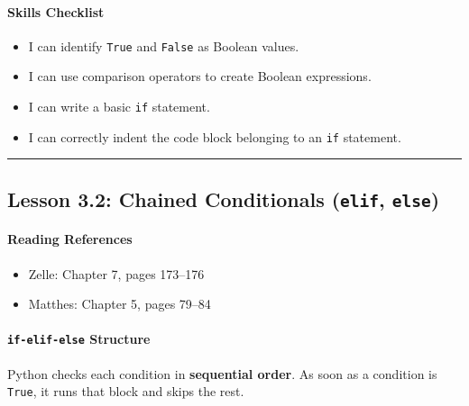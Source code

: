 \documentclass[
  justified,
  openright,
]{tufte-book}
\let\subsubsection\paragraph
\let\paragraph\paragraph
\let\subsubsection\paragraph
\let\paragraph\paragraph
\providecommand{\tightlist}{%
  \setlength{\itemsep}{0pt}\setlength{\parskip}{0pt}}
\begin{document}
\subsubsection{Skills Checklist}\label{skills-checklist-12}

\begin{itemize}
\tightlist
\item[$\square$]
  I can identify \texttt{True} and \texttt{False} as Boolean values.
\item[$\square$]
  I can use comparison operators to create Boolean expressions.
\item[$\square$]
  I can write a basic \texttt{if} statement.
\item[$\square$]
  I can correctly indent the code block belonging to an \texttt{if}
  statement.
\end{itemize}

\begin{center}\rule{0.5\linewidth}{0.5pt}\end{center}

\subsection{\texorpdfstring{Lesson 3.2: Chained Conditionals
(\texttt{elif},
\texttt{else})}{Lesson 3.2: Chained Conditionals (elif, else)}}\label{lesson-3.2-chained-conditionals-elif-else}

\subsubsection{Reading References}\label{reading-references-13}

\begin{itemize}
\tightlist
\item
  Zelle: Chapter 7, pages 173--176
\item
  Matthes: Chapter 5, pages 79--84
\end{itemize}

\subsubsection{\texorpdfstring{\texttt{if-elif-else}
Structure}{if-elif-else Structure}}\label{if-elif-else-structure}

Python checks each condition in \textbf{sequential order}. As soon as a
condition is \texttt{True}, it runs that block and skips the rest.
\end{document}
